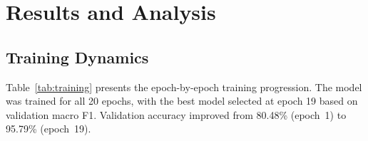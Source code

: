 \documentclass[conference, 10pt]{IEEEtran}
\begin{document}
\section{Results and Analysis}

\subsection{Training Dynamics}

Table~\ref{tab:training} presents the epoch-by-epoch training progression. The model was trained for all 20 epochs, with the best model selected at epoch 19 based on validation macro F1. Validation accuracy improved from 80.48\% (epoch~1) to 95.79\% (epoch~19).
\end{document}
